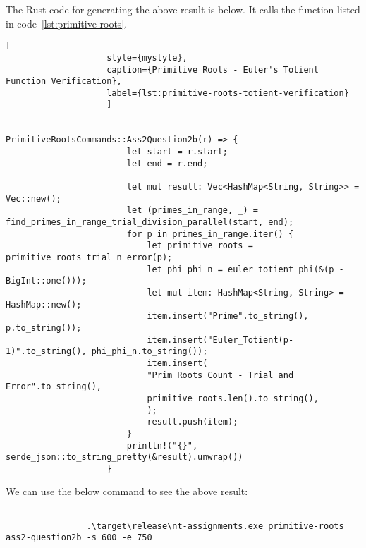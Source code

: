 \documentclass[11pt,a4paper,fleqn]{article}
\begin{document}
\begin{enumerate}[1.]
\begin{enumerate}[a.]
\begin{flushleft}
				The Rust code for generating the above result is below. It calls the function listed in code~\ref{lst:primitive-roots}.
				\begin{lstlisting}[
					style={mystyle},
					caption={Primitive Roots - Euler's Totient Function Verification},
					label={lst:primitive-roots-totient-verification}
					]
					
					            PrimitiveRootsCommands::Ass2Question2b(r) => {
						let start = r.start;
						let end = r.end;
						
						let mut result: Vec<HashMap<String, String>> = Vec::new();
						let (primes_in_range, _) = find_primes_in_range_trial_division_parallel(start, end);
						for p in primes_in_range.iter() {
							let primitive_roots = primitive_roots_trial_n_error(p);
							let phi_phi_n = euler_totient_phi(&(p - BigInt::one()));
							let mut item: HashMap<String, String> = HashMap::new();
							item.insert("Prime".to_string(), p.to_string());
							item.insert("Euler_Totient(p-1)".to_string(), phi_phi_n.to_string());
							item.insert(
							"Prim Roots Count - Trial and Error".to_string(),
							primitive_roots.len().to_string(),
							);
							result.push(item);
						}
						println!("{}", serde_json::to_string_pretty(&result).unwrap())
					}
				\end{lstlisting}
				
				\bigbreak
				We can use the below command to see the above result:
				\begin{lstlisting}[style=DOS, caption=Verify Primitive Roots Counting using Totient Function]
					
				.\target\release\nt-assignments.exe primitive-roots ass2-question2b -s 600 -e 750
				\end{lstlisting}
			\end{flushleft}
			

\end{enumerate}
\end{enumerate}
\end{document}
